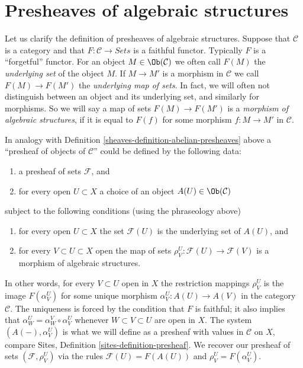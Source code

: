 \section{Presheaves of algebraic structures}
\label{sheaves-section-presheaves-structures}
Let us clarify the definition
of presheaves of algebraic structures.
Suppose that $\mathcal{C}$ is a category and
that $F : \mathcal{C} \to \textit{Sets}$ is
a faithful functor. Typically $F$ is a ``forgetful''
functor. For an object $M \in \Ob(\mathcal{C})$
we often call $F(M)$ the {\it underlying set} of the
object $M$. If $M \to M'$ is a morphism in $\mathcal{C}$
we call $F(M) \to F(M')$ the {\it underlying map of sets}.
In fact, we will often not distinguish between an object
and its underlying set, and similarly for morphisms.
So we will say a map of sets $F(M) \to F(M')$
is a {\it morphism of algebraic structures}, if it is
equal to $F(f)$ for some morphism $f : M \to M'$
in $\mathcal{C}$.

\medskip\noindent
In analogy with Definition \ref{sheaves-definition-abelian-presheaves}
above a ``presheaf of objects of $\mathcal{C}$'' could be
defined by the following data:
\begin{enumerate}
\item a presheaf of sets $\mathcal{F}$, and
\item for every open $U \subset X$ a choice
of an object $A(U) \in \Ob(\mathcal{C})$
\end{enumerate}
subject to the following conditions (using the phraseology above)
\begin{enumerate}
\item for every open $U \subset X$ the set $\mathcal{F}(U)$
is the underlying set of $A(U)$, and
\item for every $V \subset U \subset X$ open
the map of sets $\rho_V^U: \mathcal{F}(U) \to \mathcal{F}(V)$
is a morphism of algebraic structures.
\end{enumerate}
In other words, for every $V \subset U$ open in $X$
the restriction mappings $\rho^U_V$ is the image
$F(\alpha^U_V)$ for some unique morphism
$\alpha^U_V : A(U) \to A(V)$ in the category $\mathcal{C}$.
The uniqueness is forced by the condition that $F$ is
faithful; it also implies that
$\alpha^U_W = \alpha^V_W \circ \alpha^U_V$
whenever $W \subset V \subset U$ are open in $X$.
The system $(A(-), \alpha^U_V)$ is what we will define as a
presheaf with values in $\mathcal{C}$ on $X$, compare
Sites, Definition \ref{sites-definition-presheaf}.
We recover our presheaf of sets $(\mathcal{F}, \rho_V^U)$
via the rules $\mathcal{F}(U) = F(A(U))$ and
$\rho_V^U = F(\alpha_V^U)$.

